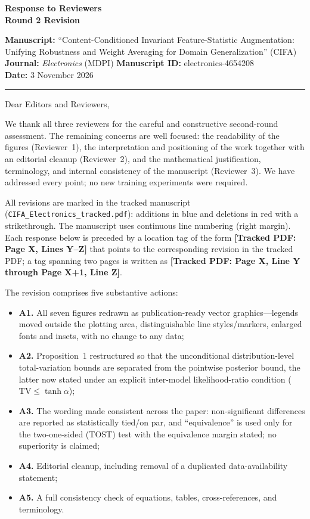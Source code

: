 \documentclass[11pt]{article}
\newcommand{\loc}[1]{\textbf{[\textcolor{revblue}{Tracked PDF: #1}]}}
\begin{document}
\begin{center}
{\Large\textbf{Response to Reviewers}}\\[0.6em]
\textbf{Round 2 Revision}
\end{center}

\textbf{Manuscript:} ``Content-Conditioned Invariant Feature-Statistic
Augmentation: Unifying Robustness and Weight Averaging for Domain
Generalization'' (CIFA)\\
\textbf{Journal:} \textit{Electronics} (MDPI)\qquad
\textbf{Manuscript ID:} electronics-4654208\\
\textbf{Date:} 3 November 2026

\hrule
\vspace{0.4em}

Dear Editors and Reviewers,

We thank all three reviewers for the careful and constructive second-round
assessment. The remaining concerns are well focused: the readability of the
figures (Reviewer~1), the interpretation and positioning of the work together
with an editorial cleanup (Reviewer~2), and the mathematical justification,
terminology, and internal consistency of the manuscript (Reviewer~3). We have
addressed every point; no new training experiments were required.

All revisions are marked in the tracked manuscript
(\texttt{CIFA\_Electronics\_tracked.pdf}): additions in blue and deletions in
red with a strikethrough. The manuscript uses continuous line numbering
(right margin). Each response below is preceded by a location tag of the form
\loc{Page X, Lines Y--Z} that points to the corresponding revision in the
tracked PDF; a tag spanning two pages is written as
\loc{Page X, Line Y through Page X+1, Line Z}.

The revision comprises five substantive actions:
\begin{itemize}
\item \textbf{A1.} All seven figures redrawn as publication-ready vector
graphics---legends moved outside the plotting area, distinguishable
line styles/markers, enlarged fonts and insets, with no change to any data;
\item \textbf{A2.} Proposition~1 restructured so that the unconditional
distribution-level total-variation bounds are separated from the pointwise
posterior bound, the latter now stated under an explicit inter-model
likelihood-ratio condition ($\mathrm{TV}\le\tanh\alpha$);
\item \textbf{A3.} The wording made consistent across the paper:
non-significant differences are reported as statistically tied/on par, and
``equivalence'' is used only for the two-one-sided (TOST) test with the
equivalence margin stated; no superiority is claimed;
\item \textbf{A4.} Editorial cleanup, including removal of a duplicated
data-availability statement;
\item \textbf{A5.} A full consistency check of equations, tables,
cross-references, and terminology.
\end{itemize}
\end{document}
